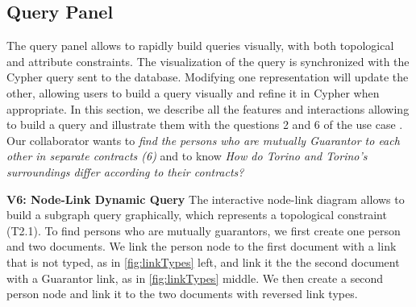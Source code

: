 
\subsection{Query Panel}

The query panel allows to rapidly build queries visually, with both topological and attribute constraints. The visualization of the query is synchronized with the Cypher query sent to the database. Modifying one representation will update the other, allowing users to build a query visually and refine it in Cypher when appropriate.
In this section, we describe all the features and interactions allowing \name to build a query and illustrate them with the questions 2 and 6 of the use case \pascal. Our collaborator wants to \textit{find the persons who are mutually Guarantor to each other in separate contracts (6)} and to know \textit{How do Torino and Torino's surroundings differ according to their contracts?}


\noindent\textbf{V6: Node-Link Dynamic Query}
The interactive node-link diagram allows to build a subgraph query graphically, which represents a topological constraint (T2.1). To find persons who are mutually guarantors, we first create one person and two documents. We link the person node to the first document with a link that is not typed, as in \autoref{fig:linkTypes} left, and link it the the second document with a Guarantor link, as in \autoref{fig:linkTypes} middle. We then create a second person node and link it to the two documents with reversed link types.


